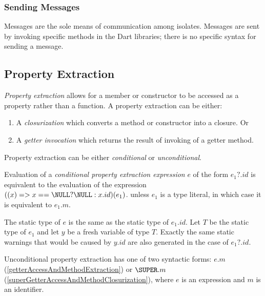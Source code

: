\documentclass{article}
\begin{document}
\subsubsection{Sending Messages}

\LMHash{}
Messages are the sole means of communication among isolates. Messages are sent by invoking specific  methods in the Dart libraries; there is no specific syntax for sending a message.




\subsection{ Property Extraction}

\LMHash{}
{\em Property extraction} allows for a member or constructor to be accessed as a property rather than a function.
A property extraction can be either:
\begin{enumerate}
\item A {\em closurization} which converts a method or constructor into a closure. Or
\item A {\em getter invocation} which returns the result of invoking of a getter method.
\end{enumerate}



Property extraction can be either {\em conditional} or {\em unconditional}.

Evaluation of a {\em conditional property extraction expression} $e$ of the form $e_1?.id$  is equivalent to the evaluation of the expression  $((x) => x == \NULL ? \NULL : x.id)(e_1)$.
unless $e_1$ is  a type literal, in which case it is equivalent to $e_1.m$.

The static type of $e$ is the same as the static type of $e_1.id$. Let $T$ be the static type of $e_1$ and let $y$ be a fresh variable of type $T$. Exactly the same static warnings that would be caused by $y.id$ are also generated in the case of $e_1?.id$.

\LMHash{}
Unconditional property extraction has one of two syntactic forms: $e.m$ (\ref{getterAccessAndMethodExtraction}) or $\SUPER.m$ (\ref{superGetterAccessAndMethodClosurization}), where $e$ is an expression and $m$ is an identifier.
\end{document}
